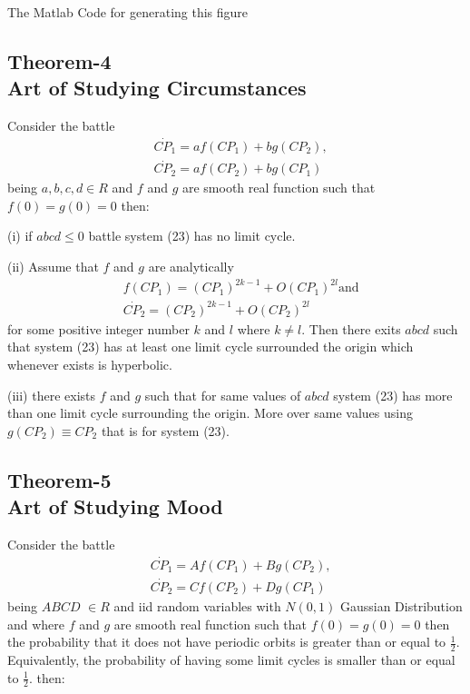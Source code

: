 \documentclass[]{article}
\begin{document}
The Matlab Code for generating this figure 
\newpage

 
\tiny

\normalsize
\newpage
\subsection{Theorem-4\\Art of Studying Circumstances }
Consider the battle
\begin{equation}
\begin{split}
    &\Dot{CP_1}=af(CP_1)+bg(CP_2),\\&\Dot{CP_2}=af(CP_2)+bg(CP_1) 
\end{split}
\end{equation}
being $a,b,c,d \in {R}$ and $f$ and $g$ are smooth real function such that $f(0)=g(0)=0$
then:

(i) if $abcd \leq 0$ battle system (23) has no limit cycle.

(ii) Assume that $f$ and $g$ are analytically
\begin{equation}
\begin{split}
  &f(CP_1)=(CP_1)^{{2k}-1}+O(CP_1)^{2l} \text{and} \\&  \Dot{CP_2}=(CP_2)^{{2k}-1}+O(CP_2)^{2l}  
\end{split}
\end{equation}
for some positive integer number $k$ and $l$ where $k \neq l$. Then there exits $abcd$ such that system (23) has at least one limit cycle surrounded the origin which whenever exists is hyperbolic.

(iii) there exists $f$ and $g$ such that for same values of $abcd$ system (23) has more than one limit cycle surrounding the origin. More over same values using $g(CP_2)\equiv CP_2$ that is for system (23).
\newpage
\subsection{Theorem-5\\Art of Studying Mood}
Consider the battle
\begin{equation}
\begin{split}
  &\Dot{CP_1}=Af(CP_1)+Bg(CP_2),\\&\Dot{CP_2}=Cf(CP_2)+Dg(CP_1)  
\end{split}
\end{equation}
being $ABCD$ $\in {R}$ and iid random variables with $N(0,1)$ Gaussian Distribution and where $f$ and $g$ are smooth real function such that $f(0)=g(0)=0$ then the probability that it does not have periodic orbits is greater than or equal to $\frac{1}{2}$. 
Equivalently, the probability of having some limit cycles is smaller than or equal to $\frac{1}{2}$.
then:
\end{document}
